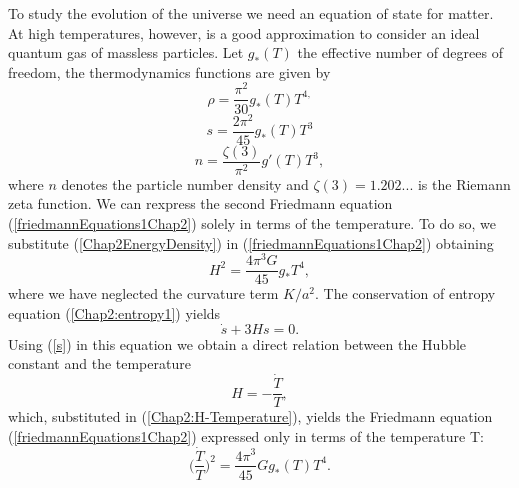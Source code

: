 \documentclass[11pt,a4paper,twoside]{book}
\begin{document}
To study the evolution of the universe we need an equation of state for matter. At high temperatures, however, is a good approximation to consider an ideal quantum gas of massless particles. Let $ g_{*}(T) $ the effective number of degrees of freedom, the thermodynamics functions are given by
\begin{equation}
\label{Chap2EnergyDensity}
\rho=\frac{\pi^{2}}{30}	g_{*}(T)T^{4,}	
\end{equation}
\begin{equation}
\label{s}
s=\frac{2\pi^{2}}{45}g_{*}(T)T^{3}
\end{equation}
\begin{equation}
	\label{n}
	n=\frac{\zeta(3)}{\pi^{2}}g'(T)T^{3},
\end{equation}
where $ n $ denotes the particle number density and $\zeta(3)=1.202...$ is the Riemann zeta function.
We can rexpress the second Friedmann equation (\ref{friedmannEquations1Chap2}) solely in terms of the temperature. To do so, we substitute (\ref{Chap2EnergyDensity}) in (\ref{friedmannEquations1Chap2})  obtaining
\begin{equation}
	\label{Chap2:H-Temperature}
	H^{2}=\frac{4\pi^{3}G}{45}g_{*}T^{4},
\end{equation}
where we have neglected  the curvature term $ K/a^{2} $.
The conservation of entropy equation (\ref{Chap2:entropy1}) yields
\begin{equation}
	\label{Chap2entropy2}
	\dot{s} + 3Hs=0.
\end{equation}
Using  (\ref{s}) in this equation we obtain a direct relation between the Hubble constant and the temperature 
\begin{equation}
	\label{Chap2:relationTemperatureEntropy}
	H=-\frac{\dot{T}}{T},
\end{equation}
which, substituted in (\ref{Chap2:H-Temperature}), yields the Friedmann equation (\ref{friedmannEquations1Chap2}) expressed only in terms of the temperature T: 
\begin{equation}
	\label{Chap2:Friedmann-Temperature}
	\Big(\frac{\dot{T}}{T}\Big)^{2}=\frac{4\pi^{3}}{45}Gg_{*}(T)T^{4}.
\end{equation}
\end{document}
